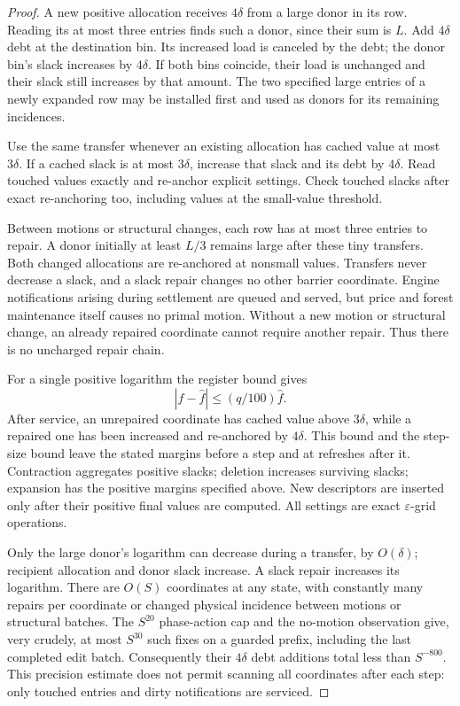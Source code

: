 \begin{proof}
A new positive allocation receives \(4\delta\) from a large donor
in its row.  Reading its at most three entries finds such a donor,
since their sum is \(L\).  Add \(4\delta\) debt at the destination
bin.  Its increased load is canceled by the debt; the donor bin's
slack increases by \(4\delta\).  If both bins coincide, their load
is unchanged and their slack still increases by that amount.
The two specified large entries of a newly expanded row may be
installed first and used as donors for its remaining incidences.

Use the same transfer whenever an existing allocation has cached
value at most \(3\delta\).  If a cached slack is at most \(3\delta\),
increase that slack and its debt by \(4\delta\).  Read touched values
exactly and re-anchor explicit settings.  Check touched slacks after
exact re-anchoring too, including values at the small-value threshold.

Between motions or structural changes, each row has at most three
entries to repair.  A donor initially at least \(L/3\) remains large
after these tiny transfers.  Both changed allocations are re-anchored
at nonsmall values.  Transfers never decrease a slack, and a slack
repair changes no other barrier coordinate.  Engine notifications
arising during settlement are queued and served, but price and
forest maintenance itself causes no primal motion.  Without a new
motion or structural change, an already repaired coordinate cannot
require another repair.  Thus there is no uncharged repair chain.

For a single positive logarithm the register bound gives
\[
                         |f-\widehat f|\le(q/100)\widehat f.
\]
After service, an unrepaired coordinate has cached value above
\(3\delta\), while a repaired one has been increased and re-anchored
by \(4\delta\).  This bound and the step-size bound leave the stated
margins before a step and at refreshes after it.
Contraction aggregates positive slacks; deletion increases surviving
slacks; expansion has the positive margins specified above.
New descriptors are inserted only after their positive final values
are computed.  All settings are exact \(\varepsilon\)-grid operations.

Only the large donor's logarithm can decrease during a transfer,
by \(O(\delta)\); recipient allocation and donor slack increase.
A slack repair increases its logarithm.  There are \(O(S)\)
coordinates at any state, with constantly many repairs per coordinate
or changed physical incidence between motions or structural batches.
The \(S^{20}\) phase-action cap and the no-motion observation give,
very crudely, at most \(S^{30}\) such fixes on a guarded prefix,
including the last completed edit batch.  Consequently their
\(4\delta\) debt additions total less than \(S^{-800}\).
This precision estimate does not permit scanning all coordinates
after each step: only touched entries and dirty notifications are
serviced.


\end{proof}
